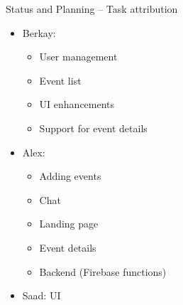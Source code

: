 \documentclass[logo=EURECOM,english]{eurecombeamer}
\begin{document}
\begin{frame}{Status and Planning -- Task attribution}
\begin{itemize}
\item Berkay:
	\begin{itemize}
	\item User management
	\item Event list
	\item UI enhancements
	\item Support for event details
	\end{itemize}
\item Alex:
	\begin{itemize}
	\item Adding events
	\item Chat
	\item Landing page
	\item Event details
	\item Backend (Firebase functions)
	\end{itemize}
\item Saad: UI
\end{itemize}
\end{frame}

\begin{frame}
\end{frame}

\begin{frame}
\end{frame}
\end{document}
